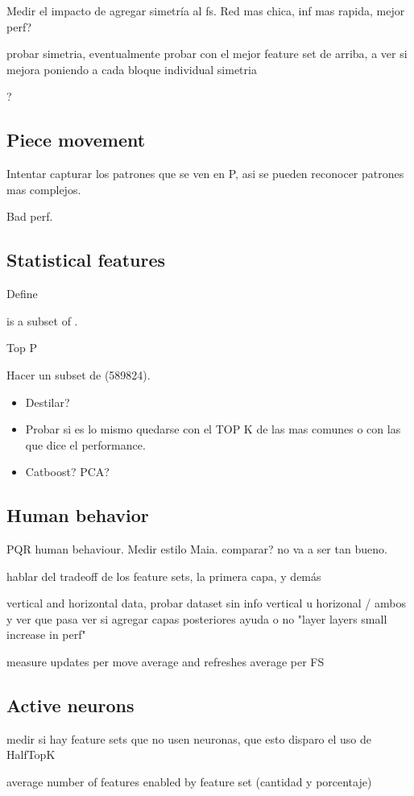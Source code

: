 Medir el impacto de agregar simetría al fs. Red mas chica, inf mas rapida, mejor perf?

probar simetria, eventualmente probar con el mejor feature set de arriba, a ver si mejora poniendo a cada bloque individual simetria

?

\subsection{Piece movement}

Intentar capturar los patrones que se ven en P, asi se pueden reconocer patrones mas complejos.


Bad perf.

\subsection{Statistical features}

Define 

 is a subset of .

Top P

Hacer un subset de  (589824).

\begin{itemize}
\item Destilar?
\item Probar si es lo mismo quedarse con el TOP K de las mas comunes o con las que dice el performance.
\item Catboost? PCA?
\end{itemize}

\subsection{Human behavior}

PQR human behaviour. Medir estilo Maia. comparar? no va a ser tan bueno.




hablar del tradeoff de los feature sets, la primera capa, y demás

vertical and horizontal data, probar dataset sin info vertical u horizonal / ambos y ver que pasa
ver si agregar capas posteriores ayuda o no "layer layers small increase in perf"

measure updates per move average and refreshes average per FS



\subsection{Active neurons}

medir si hay feature sets que no usen neuronas, que esto disparo el uso de HalfTopK

average number of features enabled by feature set (cantidad y porcentaje)



